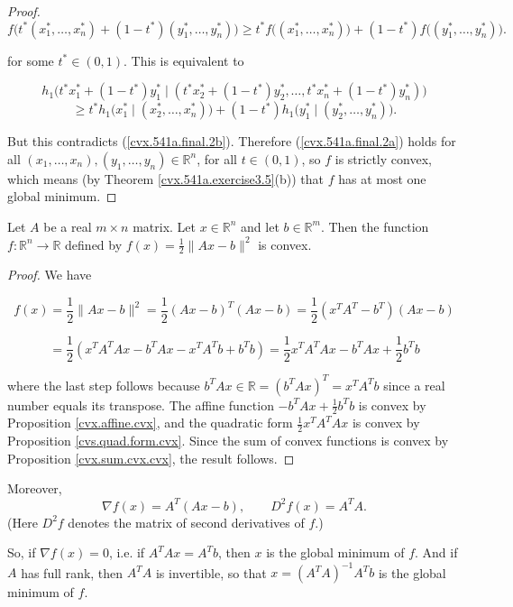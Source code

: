 \begin{proof}
\[
f \big(t^*(x_1^*, \ldots, x_n^*) + (1-t^*)(y_1^*, \ldots, y_n^*) \big) \geq t^* f \big( (x_1^*, \ldots, x_n^*)  \big) + (1-t^*) f \big( (y_1^*, \ldots, y_n^*)  \big).
\]

for some \(t^* \in (0,1)\). This is equivalent to

\[
 h_1 \big(t^*x_1^* + (1-t^*)y_1^*  \mid (t^*x_2^* + (1-t^*)y_2^*, \ldots,  t^*x_n^* + (1-t^*)y_n^*)  \big) 
 \]
 \[
   \geq t^* h_1 \big(x_1^* \mid (x_2^*, \ldots, x_n^*) \big) + (1-t^*) h_1 \big(y_1^* \mid  (y_2^*, \ldots,  y_n^*)  \big).
\]

 But this contradicts (\ref{cvx.541a.final.2b}). Therefore (\ref{cvx.541a.final.2a}) holds  for all \((x_1, \ldots, x_n), (y_1, \ldots, y_n) \in \mathbb{R}^n\), for all \(t \in (0,1)\), so \(f\) is strictly convex, which means (by Theorem \ref{cvx.541a.exercise3.5}(b)) that \(f\) has at most one global minimum.
 

\end{proof}


\begin{proposition}\label{cvx.least.squares.cvx}
Let $A$ be a real $m\times n$ matrix. Let $x\in\mathbb{R}^{n}$ and let $b\in\mathbb{R}^{m}$. Then the function $f\colon\mathbb{R}^{n}\to\mathbb{R}$ defined by $f(x)=\frac{1}{2}\lVert Ax-b\rVert ^{2}$ is convex.


\end{proposition}

\begin{proof}



We have

\[
f(x) = \frac{1}{2} \lVert Ax - b \rVert^2 = \frac{1}{2} (Ax - b)^T (Ax -b) = \frac{1}{2} (x^TA^T - b^T)(Ax -b) 
\]

\[
= \frac{1}{2} (x^TA^TAx  - b^TAx   - x^TA^Tb + b^T b) = \frac{1}{2} x^TA^TAx  - b^TAx + \frac{1}{2}b^T b
\]

where the last step follows because \(b^TAx \in \mathbb{R} = (b^TAx)^T =  x^TA^Tb \) since a real number equals its transpose. The affine function \( - b^TAx + \frac{1}{2}b^T b\) is convex by Proposition \ref{cvx.affine.cvx}, and the quadratic form \( \frac{1}{2} x^TA^TAx \) is convex by Proposition \ref{cvs.quad.form.cvx}. Since the sum of convex functions is convex by Proposition \ref{cvx.sum.cvx.cvx}, the result follows.


\end{proof}

\begin{remark} Moreover,
$$\nabla f(x)=A^{T}(Ax-b),\qquad D^{2}f(x)=A^{T}A.$$
(Here $D^{2}f$ denotes the matrix of second derivatives of $f$.)

So, if $\nabla f(x)=0$, i.e. if $A^{T}Ax=A^{T}b$, then $x$ is the global minimum of $f$.  And if $A$ has full rank, then $A^{T}A$ is invertible, so that $x=(A^{T}A)^{-1}A^{T}b$ is the global minimum of $f$.
\end{remark}

